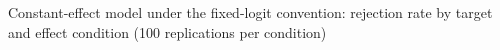 \begin{table}[ht]
\centering
\caption{Constant-effect model under the fixed-logit convention: rejection rate by target and effect condition (100 replications per condition)}
\label{tab:app-arm-logit}
\footnotesize

\end{table}
